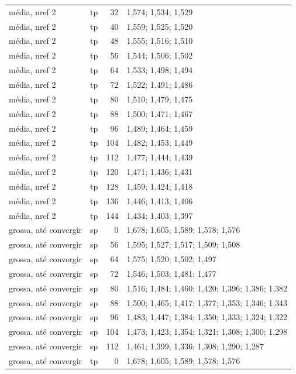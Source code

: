 \begin{tabular}{llr|l}
média, nref 2 & tp & 32 & 1{,}574; 1{,}534; 1{,}529\\
média, nref 2 & tp & 40 & 1{,}559; 1{,}525; 1{,}520\\
média, nref 2 & tp & 48 & 1{,}555; 1{,}516; 1{,}510\\
média, nref 2 & tp & 56 & 1{,}544; 1{,}506; 1{,}502\\
média, nref 2 & tp & 64 & 1{,}533; 1{,}498; 1{,}494\\
média, nref 2 & tp & 72 & 1{,}522; 1{,}491; 1{,}486\\
média, nref 2 & tp & 80 & 1{,}510; 1{,}479; 1{,}475\\
média, nref 2 & tp & 88 & 1{,}500; 1{,}471; 1{,}467\\
média, nref 2 & tp & 96 & 1{,}489; 1{,}464; 1{,}459\\
média, nref 2 & tp & 104 & 1{,}482; 1{,}453; 1{,}449\\
média, nref 2 & tp & 112 & 1{,}477; 1{,}444; 1{,}439\\
média, nref 2 & tp & 120 & 1{,}471; 1{,}436; 1{,}431\\
média, nref 2 & tp & 128 & 1{,}459; 1{,}424; 1{,}418\\
média, nref 2 & tp & 136 & 1{,}446; 1{,}413; 1{,}406\\
média, nref 2 & tp & 144 & 1{,}434; 1{,}403; 1{,}397\\
grossa, até convergir & sp & 0 & 1{,}678; 1{,}605; 1{,}589; 1{,}578; 1{,}576\\
grossa, até convergir & sp & 56 & 1{,}595; 1{,}527; 1{,}517; 1{,}509; 1{,}508\\
grossa, até convergir & sp & 64 & 1{,}575; 1{,}520; 1{,}502; 1{,}497\\
grossa, até convergir & sp & 72 & 1{,}546; 1{,}503; 1{,}481; 1{,}477\\
grossa, até convergir & sp & 80 & 1{,}516; 1{,}484; 1{,}460; 1{,}420; 1{,}396; 1{,}386; 1{,}382\\
grossa, até convergir & sp & 88 & 1{,}500; 1{,}465; 1{,}417; 1{,}377; 1{,}353; 1{,}346; 1{,}343\\
grossa, até convergir & sp & 96 & 1{,}483; 1{,}447; 1{,}384; 1{,}350; 1{,}333; 1{,}324; 1{,}322\\
grossa, até convergir & sp & 104 & 1{,}473; 1{,}423; 1{,}354; 1{,}321; 1{,}308; 1{,}300; 1{,}298\\
grossa, até convergir & sp & 112 & 1{,}461; 1{,}399; 1{,}336; 1{,}308; 1{,}290; 1{,}287\\
grossa, até convergir & tp & 0 & 1{,}678; 1{,}605; 1{,}589; 1{,}578; 1{,}576\\

\end{tabular}
